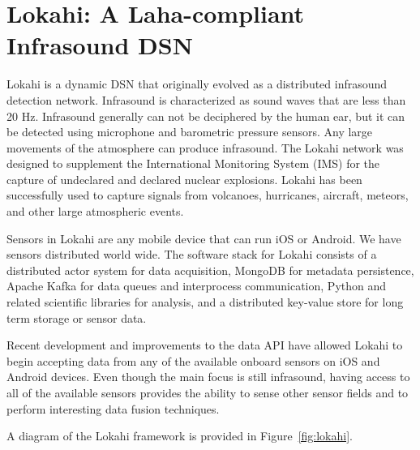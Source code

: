 \section{Lokahi: A Laha-compliant Infrasound DSN}\label{sec:lokahi:-a-laha-compliant-infrasound-dsn}
Lokahi is a dynamic DSN that originally evolved as a distributed infrasound detection network. Infrasound is characterized as sound waves that are less than 20 Hz. Infrasound generally can not be deciphered by the human ear, but it can be detected using microphone and barometric pressure sensors. Any large movements of the atmosphere can produce infrasound. The Lokahi network was designed to supplement the International Monitoring System (IMS) for the capture  of undeclared and declared nuclear explosions. Lokahi has been successfully used to capture signals from volcanoes, hurricanes, aircraft, meteors, and other large atmospheric events.

Sensors in Lokahi are any mobile device that can run iOS or Android. We have sensors distributed world wide. The software stack for Lokahi consists of a distributed actor system for data acquisition, MongoDB for metadata persistence, Apache Kafka for data queues and interprocess communication, Python and related scientific libraries for analysis, and a distributed key-value store for long term storage or sensor data.

Recent development and improvements to the data API have allowed Lokahi to begin accepting data from any of the available onboard sensors on iOS and Android devices. Even though the main focus is still infrasound, having access to all of the available sensors provides the ability to sense other sensor fields and to perform interesting data fusion techniques.

A diagram of the Lokahi framework is provided in Figure~\ref{fig:lokahi}.

